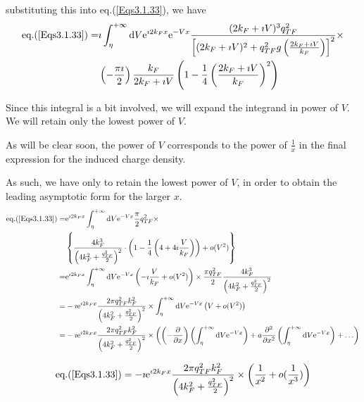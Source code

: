 \begin{itemize}
substituting this into eq.(\ref{Eqs3.1.33}), we have
\[\begin{split}
\text{eq.(\ref{Eqs3.1.33})} = &\imath \int_{\eta}^{+\infty} \mathrm{d} V \mathrm{e}^{\imath 2 k_F x} \mathrm{e}^{-V x} \frac{(2 k_F + \imath V)^3 q_{TF}^2}{\left[ (2 k_F + \imath V)^2 + q_{TF}^2 g\left( \frac{2 k_F +\imath V}{k_F}\right) \right]^2}\times\\
&\left(- \frac{\pi \imath}{2}\right) \frac{k_F}{2 k_F + \imath V} \left( 1- \frac{1}{4}\left( \frac{2 k_F +\imath V}{k_F} \right)^2 \right)
\end{split}\]

Since this integral is a bit involved, we will expand the integrand in power of $V$. We will retain only the lowest power of $V$.

As will be clear soon, the power of $V$ corresponds to the power of $\frac{1}{x}$ in the final expression for the induced charge density.

As such, we have only to retain the lowest power of $V$, in order to obtain the leading asymptotic form for the larger $x$.
\[\allowdisplaybreaks\begin{split}
\text{eq.(\ref{Eqs3.1.33})} = &\mathrm{e}^{\imath 2 k_F x} \int_{\eta}^{+\infty} \mathrm{d} V  \mathrm{e}^{-V x} \frac{\pi}{2}q_{TF}^2\times\\
&\left\{ \frac{4 k_F^3}{\left( 4 k_F^2 + \frac{q_{TF}^2}{2} \right)^2} \cdot \left( 1-\frac{1}{4}\left( 4 + 4 \imath \frac{V}{k_F} \right) \right) + o(V^2) \right\}\\
=&\mathrm{e}^{\imath 2 k_F x} \int_{\eta}^{+\infty} \mathrm{d} V  \mathrm{e}^{-V x} \left( -\imath \frac{V}{k_F} + o(V^2) \right) \times \frac{\pi q_{TF}^2}{2} \frac{4 k_F^3}{\left( 4 k_F^2 + \frac{q_{TF}^2}{2} \right)^2}\\
=&-\imath \mathrm{e}^{\imath 2 k_F x} \frac{2\pi q_{TF}^2 k_F^2}{\left( 4 k_F^2 + \frac{q_{TF}^2}{2} \right)^2} \times \int_{\eta}^{+\infty} \mathrm{d} V  \mathrm{e}^{-V x} \left( V + o(V^2) \right)\\
=&-\imath \mathrm{e}^{\imath 2 k_F x} \frac{2\pi q_{TF}^2 k_F^2}{\left( 4 k_F^2 + \frac{q_{TF}^2}{2} \right)^2} \times \left( \left( -\frac{\partial}{\partial x} \right) \left( \int_{\eta}^{+\infty} \mathrm{d} V  \mathrm{e}^{-V x} \right) + a \frac{\partial^2}{\partial x^2} \left( \int_{\eta}^{+\infty} \mathrm{d} V  \mathrm{e}^{-V x} \right) + \ldots \right)
\end{split}\]

\begin{equation} \label{Eqs3.1.34}
\text{eq.(\ref{Eqs3.1.33})} = -\imath \mathrm{e}^{\imath 2 k_F x} \frac{2\pi q_{TF}^2 k_F^2}{\left( 4 k_F^2 + \frac{q_{TF}^2}{2} \right)^2} \times \left( \frac{1}{x^2} + o(\frac{1}{x^3}) \right)
\end{equation}


\end{itemize}
